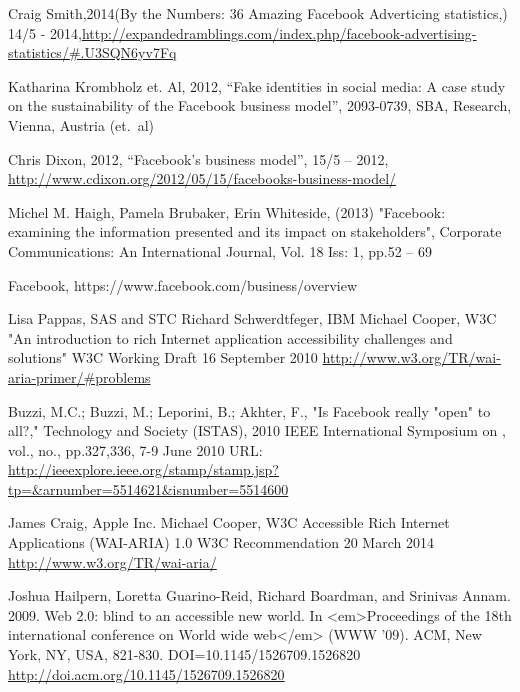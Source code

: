 \documentclass[conference]{IEEEtran}
\begin{document}
\begin{thebibliography}{1}
Craig Smith,2014(By the Numbers: 36 Amazing Facebook Adverticing statistics,) 14/5 - 2014,\href{http://expandedramblings.com/index.php/facebook-advertising-statistics/\#.U3SQN6yv7Fq}{http://expandedramblings.com/index.php/facebook-advertising-statistics/\#.U3SQN6yv7Fq}

Katharina Krombholz et. Al, 2012, “Fake identities in social media: A case
study on the sustainability of the Facebook business model”, 2093-0739, SBA,
Research, Vienna, Austria (et.\ al)

Chris Dixon, 2012, “Facebook's business model”, 15/5 – 2012,
\href{http://www.cdixon.org/2012/05/15/facebooks-business-model/}{http://www.cdixon.org/2012/05/15/facebooks-business-model/}

Michel M. Haigh, Pamela Brubaker, Erin Whiteside, (2013) "Facebook: examining
the information presented and its impact on stakeholders", Corporate
Communications: An International Journal, Vol. 18 Iss: 1, pp.52 – 69

Facebook, https://www.facebook.com/business/overview



Lisa Pappas, SAS and STC
Richard Schwerdtfeger, IBM
Michael Cooper, W3C
"An introduction to rich Internet application accessibility challenges and solutions"
W3C Working Draft 16 September 2010
\href{http://www.w3.org/TR/wai-aria-primer/\#problems}{http://www.w3.org/TR/wai-aria-primer/\#problems }

Buzzi, M.C.; Buzzi, M.; Leporini, B.; Akhter, F., "Is Facebook really "open" to
all?," Technology and Society (ISTAS), 2010 IEEE International Symposium on ,
vol., no., pp.327,336, 7-9 June 2010
URL: \href{http://ieeexplore.ieee.org/stamp/stamp.jsp?tp=\&arnumber=5514621\&isnumber=5514600}{http://ieeexplore.ieee.org/stamp/stamp.jsp?tp=\&arnumber=5514621\&isnumber=5514600}

James Craig, Apple Inc.
Michael Cooper, W3C
Accessible Rich Internet Applications (WAI-ARIA) 1.0
W3C Recommendation 20 March 2014
\url{http://www.w3.org/TR/wai-aria/ }

Joshua Hailpern, Loretta Guarino-Reid, Richard Boardman, and Srinivas Annam.
2009. Web 2.0: blind to an accessible new world. In <em>Proceedings of the
18th international conference on World wide web</em> (WWW '09). ACM, New York,
NY, USA, 821-830. DOI=10.1145/1526709.1526820
\href{http://doi.acm.org/10.1145/1526709.1526820}{http://doi.acm.org/10.1145/1526709.1526820}


\end{thebibliography}
\end{document}
